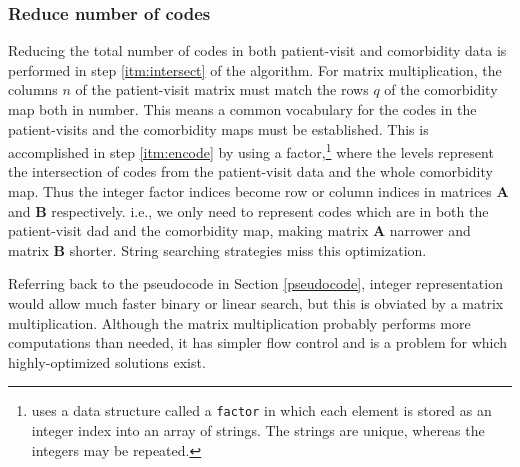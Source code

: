 \documentclass[article]{jss}
\begin{document}
\hypertarget{reduce-number-of-codes}{%
\subsubsection{Reduce number of codes}\label{reduce-number-of-codes}}

Reducing the total number of codes in both patient-visit and comorbidity
data is performed in step \ref{itm:intersect} of the algorithm. For
matrix multiplication, the columns \(n\) of the patient-visit matrix
must match the rows \(q\) of the comorbidity map both in number. This
means a common vocabulary for the codes in the patient-visits and the
comorbidity maps must be established. This is accomplished in step
\ref{itm:encode} by using a factor,\footnote{ uses a data
  structure called a \texttt{factor} in which each element is stored as
  an integer index into an array of strings. The strings are unique,
  whereas the integers may be repeated.} where the levels represent the
intersection of codes from the patient-visit data and the whole
comorbidity map. Thus the integer factor indices become row or column
indices in matrices \(\boldsymbol{A}\) and \(\boldsymbol{B}\)
respectively. i.e., we only need to represent codes which are in both
the patient-visit dad and the comorbidity map, making matrix
\(\boldsymbol{A}\) narrower and matrix \(\boldsymbol{B}\) shorter.
String searching strategies miss this optimization.

Referring back to the pseudocode in Section \ref{pseudocode}, integer
representation would allow much faster binary or linear search, but this
is obviated by a matrix multiplication. Although the matrix
multiplication probably performs more computations than needed, it has
simpler flow control and is a problem for which highly-optimized
solutions exist.
\end{document}
